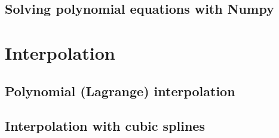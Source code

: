 \documentclass[article,A4,12pt]{llncs}
\begin{document}
\subsection{Solving polynomial equations with Numpy}





\section{Interpolation}





\subsection{Polynomial (Lagrange) interpolation}




\subsection{Interpolation with cubic splines}







\end{document}
